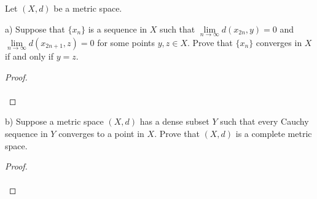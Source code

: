 Let $(X, d)$ be a metric space. 

a) Suppose that $\{x_n\}$ is a sequence in $X$ such that $\lim\limits_{n \to \infty}{d(x_{2n}, y) = 0}$ and
   $\lim\limits_{n \to \infty}{d(x_{2n + 1}, z) = 0}$ for some points $y, z \in X$. Prove that $\{x_n\}$ converges in 
   $X$ if and only if $y = z$.

\begin{proof}\renewcommand{\qedsymbol}{}\ \\\\
\end{proof}

\pagebreak

b) Suppose a metric space $(X, d)$ has a dense subset $Y$ such that every Cauchy sequence in $Y$ converges to a point
   in $X$. Prove that $(X, d)$ is a complete metric space.

\begin{proof}\renewcommand{\qedsymbol}{}\ \\\\
\end{proof}
